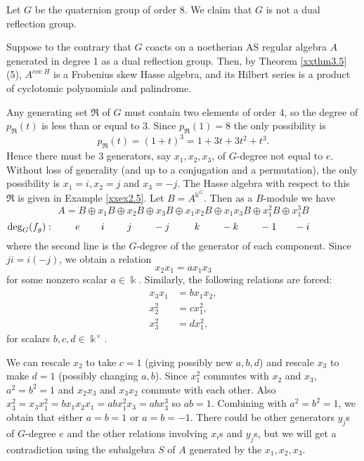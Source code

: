 \begin{example}
\label{xxex3.8}
Let $G$ be the quaternion group of order 8. We claim that $G$ is not
a dual reflection group. 

Suppose to the contrary that $G$ coacts on a noetherian AS regular 
algebra $A$ generated in degree 1 as a dual reflection group. 
Then, by Theorem \ref{xxthm3.5}(5), $A^{cov\; H}$ is a Frobenius 
skew Hasse algebra, and its Hilbert series is a product of 
cyclotomic polynomials and palindrome.

Any generating set $\Re$ of $G$ must contain two elements of order 4, 
so the degree of $p_{\Re}(t)$ is less than or equal to 3.  Since 
$p_{\Re}(1) = 8$ the only possibility is 
$$p_{\Re}(t) = (1+t)^3 = 1 + 3 t +3 t^2 + t^3.$$  
Hence there must be 3 generators, say $x_1, x_2,x_3$, of 
$G$-degree not equal to $e$.  
Without loss of generality (and up to a conjugation and a 
permutation), the only possibility is $x_1 = i, x_2 = j$ 
and $x_3 = -j$. The Hasse algebra with respect to this $\Re$ is given 
in Example \ref{xxex2.5}. Let $B=A^{\Bbbk^G}$. Then as a $B$-module we have
$$A = B \oplus x_1 B \oplus x_2 B \oplus x_3 B \oplus x_1x_2 B 
\oplus x_1x_3 B \oplus x_1^2 B \oplus x_1^3 B$$
$$\deg_G(f_g):
\hspace*{.3in} e \hspace{.3in} i \hspace*{.32in} j\hspace*{.3in} 
-j \hspace*{.35in} k\hspace*{.3in} -k 
\hspace*{.3in} -1 \hspace*{.25in} -i\qquad\qquad\quad $$
where the second line is the $G$-degree of the generator of each
component. Since $j i=i (-j)$, we obtain a relation
$$x_2 x_1= a x_1 x_3$$
for some nonzero scalar $a\in \Bbbk$. Similarly,
the following relations are forced:
$$\begin{aligned}
x_3x_1 &= b x_1 x_2,\\
x_2^2 &= c x_1^2,\\
x_3^2 &= d x_1^2,
\end{aligned}
$$
for scalars $b,c,d\in \Bbbk^{\times}$.

We can rescale $x_2$ to take $c=1$ (giving possibly new $a, b,d$) 
and rescale $x_3$ to make $d=1$ (possibly changing $a,b$).  Since 
$x_1^2$ commutes with $x_2$ and $x_3$, $a^2=b^2=1$ and 
$x_2x_3$ and $x_3x_2$ commute with each other.  Also $x_3^2 = x_3x_1^2 
= bx_1x_2x_1 = ab x_1^2x_3 = ab x_3^3$ so $ab=1$. Combining with
$a^2=b^2=1$, we obtain that either $a=b=1$ or $a=b=-1$.  
There could be other generators $y_j$s of $G$-degree $e$
and the other relations involving $x_i$s and $y_j$s, but we 
will get a contradiction using the subalgebra $S$ of $A$ 
generated by the $x_1, x_2,x_3$.   


\end{example}
